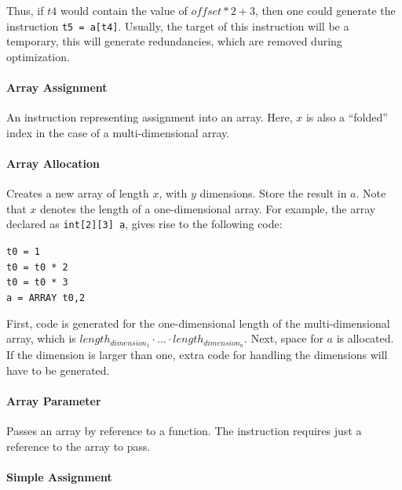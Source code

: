 \documentclass[a4paper]{article}
\begin{document}
Thus, if $t4$ would contain the value of $offset*2+3$, then one could generate
the instruction \texttt{t5 = a[t4]}. Usually, the target of this instruction
will be a temporary, this will generate redundancies, which are removed during
optimization.

\paragraph{Array Assignment\\}

An instruction representing assignment into an array. Here, $x$ is also a
``folded'' index in the case of a multi-dimensional array.

\paragraph{Array Allocation\\}

Creates a new array of length $x$, with $y$ dimensions. Store the result in
$a$. Note that $x$ denotes the length of a one-dimensional array.
For example, the array declared as \texttt{int[2][3] a}, gives rise to the
following code:
\begin{center}
\texttt{t0 = 1}\\
\texttt{t0 = t0 * 2}\\
\texttt{t0 = t0 * 3}\\
\texttt{a = ARRAY t0,2}\\
\end{center}

First, code is generated for the one-dimensional length of the
multi-dimensional array, which is $length_{dimension_1} \cdot \ldots \cdot
length_{dimension_n}$. Next, space for $a$ is allocated. If the dimension
is larger than one, extra code for handling the dimensions will have to be
generated.

\paragraph{Array Parameter\\}

Passes an array by reference to a function. The instruction requires just a
reference to the array to pass.

\paragraph{Simple Assignment\\}
\end{document}
